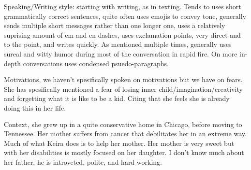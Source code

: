 Speaking/Writing style: starting with writing, as in texting. Tends to uses short grammatically correct sentences, quite often uses emojis to convey tone, generally sends multiple short messages rather than one longer one, uses a relatively suprising amount of em and en dashes, uses exclamation points, very direct and to the point, and writes quickly. As mentioned multiple times, generally uses sureal and witty humor during most of the conversation in rapid fire. On more in-depth conversations uses condensed psuedo-paragraphs.

Motivations, we haven't spesifically spoken on motivations but we have on fears. She has spesifically mentioned a fear of losing inner child/imagination/creativity and forgetting what it is like to be a kid. Citing that she feels she is already doing this in her life.

Context, she grew up in a quite conservative home in Chicago, before moving to Tennessee. Her mother suffers from cancer that debilitates her in an extreme way. Much of what Keira does is to help her mother. Her mother is very sweet but with her disabilities is mostly focused on her daughter. I don't know much about her father, he is introveted, polite, and hard-working.
